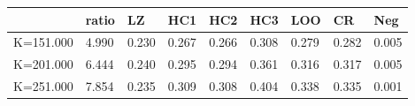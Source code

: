 \begin{table}[ht]
\centering
\begin{tabular}{rllllllll}
  \hline
 & ratio & LZ & HC1 & HC2 & HC3 & LOO & CR & Neg \\ 
  \hline
K=151.000 & 4.990 & 0.230 & 0.267 & 0.266 & 0.308 & 0.279 & 0.282 & 0.005 \\ 
  K=201.000 & 6.444 & 0.240 & 0.295 & 0.294 & 0.361 & 0.316 & 0.317 & 0.005 \\ 
  K=251.000 & 7.854 & 0.235 & 0.309 & 0.308 & 0.404 & 0.338 & 0.335 & 0.001 \\ 
   \hline
\end{tabular}
\end{table}

